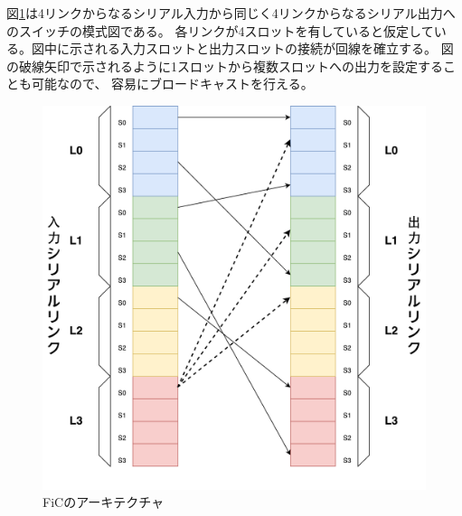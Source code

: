 {図\ref{fig:arch-sw}は4リンクからなるシリアル入力から同じく4リンクからなるシリアル出力へのスイッチの模式図である。
各リンクが4スロットを有していると仮定している。図中に示される入力スロットと出力スロットの接続が回線を確立する。
図の破線矢印で示されるように1スロットから複数スロットへの出力を設定することも可能なので、
容易にブロードキャストを行える。

 \begin{figure}[h]
   \centering
   \includegraphics[width=12cm]{./chap3/fig/arch_sw.pdf}
   \caption{FiCのアーキテクチャ}
   \label{fig:arch-sw}
 \end{figure}

}

